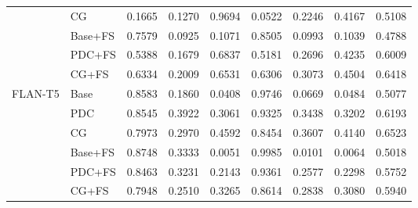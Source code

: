 \begin{table*}[]
\begin{tabular}{@{}cllllllll@{}}
                         & CG      & 0.1665 & 0.1270 & 0.9694 & 0.0522 & 0.2246 & 0.4167 & 0.5108 \\
                         & Base+FS & 0.7579 & 0.0925 & 0.1071 & 0.8505 & 0.0993 & 0.1039 & 0.4788 \\
                         & PDC+FS  & 0.5388 & 0.1679 & 0.6837 & 0.5181 & 0.2696 & 0.4235 & 0.6009 \\
                         & CG+FS   & 0.6334 & 0.2009 & 0.6531 & 0.6306 & 0.3073 & 0.4504 & 0.6418 \\
\hline
\multirow{6}{*}{FLAN-T5} & Base    & 0.8583 & 0.1860 & 0.0408 & 0.9746 & 0.0669 & 0.0484 & 0.5077 \\
                         & PDC     & 0.8545 & 0.3922 & 0.3061 & 0.9325 & 0.3438 & 0.3202 & 0.6193 \\
                         & CG      & 0.7973 & 0.2970 & 0.4592 & 0.8454 & 0.3607 & 0.4140 & 0.6523 \\
                         & Base+FS & 0.8748 & 0.3333 & 0.0051 & 0.9985 & 0.0101 & 0.0064 & 0.5018 \\
                         & PDC+FS  & 0.8463 & 0.3231 & 0.2143 & 0.9361 & 0.2577 & 0.2298 & 0.5752 \\
                         & CG+FS   & 0.7948 & 0.2510 & 0.3265 & 0.8614 & 0.2838 & 0.3080 & 0.5940 \\ \cmidrule(l){1-9} 
\end{tabular}
\end{table*}

